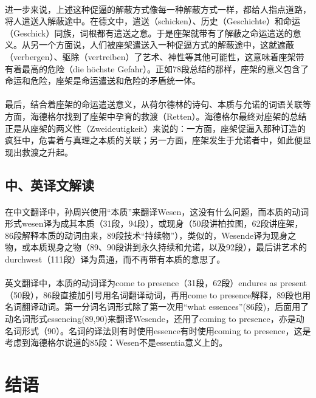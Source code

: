 \documentclass{article}
\begin{document}
		\paragraph{}
		进一步来说，上述这种促逼的解蔽方式像每一种解蔽方式一样，都给人指点道路，将人遣送入解蔽途中。在德文中，遣送（schicken）、历史（Geschichte）和命运（Geschick）同族，词根都有遣送之意。于是座架就带有了解蔽之命运遣送的意义。从另一个方面说，人们被座架遣送入一种促逼方式的解蔽途中，这就遮蔽（verbergen）、驱除（vertreiben）了艺术、神性等其他可能性，这意味着座架带有着最高的危险（die höchste Gefahr）。正如78段总结的那样，座架的意义包含了命运和危险，座架是命运遣送和危险的矛盾统一体。
		\paragraph{}
		最后，结合着座架的命运遣送意义，从荷尔德林的诗句、本质与允诺的词语关联等方面，海德格尔找到了座架中孕育的救渡（Retten）。海德格尔最终对座架的总结正是从座架的两义性（Zweideutigkeit）来说的：一方面，座架促逼入那种订造的疯狂中，危害着与真理之本质的关联；另一方面，座架发生于允诺者中，如此便显现出救渡之升起。
	\subsection{中、英译文解读}
		\paragraph{}
		在中文翻译中，孙周兴使用“本质”来翻译Wesen，这没有什么问题，而本质的动词形式wesen译为成其本质（31段，94段），或现身（50段讲柏拉图，62段讲座架，86段解释本质的动词由来，89段技术“持续物”），类似的，Wesende译为现身之物，或本质现身之物（89、90段讲到永久持续和允诺，以及92段），最后讲艺术的durchwest（111段）译为贯通，而不再带有本质的意思了。
		\paragraph{}
		英文翻译中，本质的动词译为come to presence（31段，62段）endures as present（50段），86段直接加引号用名词翻译动词，再用come to presence解释，89段也用名词翻译动词。第一分词名词形式除了第一次用“what essences”(86段)，后面用了动名词形式essencing(89,90)来翻译Wesende，还用了coming to presence，亦是动名词形式（90）。名词的译法则有时使用essence有时使用coming to presence，这是考虑到海德格尔说道的85段：Wesen不是essentia意义上的。
\section{结语}
\end{document}
